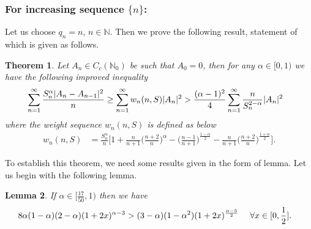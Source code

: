 \documentclass[12pt]{amsart}
\newtheorem{Theorem}{\sc Theorem}[section]
\newtheorem{Lemma}[Theorem]{\sc Lemma}
\theoremstyle{definition}
\theoremstyle{plain}
\theoremstyle{definition}
\numberwithin{equation}{section}
\begin{document}
\subsubsection{For increasing sequence $\{n\}$:}
Let us choose $q_n=n$, $n\in \mathbb{N}$. Then we prove the following result, statement of which is given as follows.
\begin{Theorem}{\label{COP-n}}
Let $A_{n}\in C_{c}(\mathbb{N}_0)$ be such that $A_{0}=0$, then for any $\alpha\in[0,1)$ we have the following improved inequality
\begin{align}{\label{COP-ninq}}
&\displaystyle\sum_{n=1}^{\infty}\frac{S_{n}^{\alpha}|A_n-A_{n-1}|^{2}}{n}\geq\displaystyle\sum_{n=1}^{\infty}w_{n}(n,S)|A_{n}|^{2}>\frac{(\alpha-1)^{2}}{4}
\displaystyle\sum_{n=1}^{\infty}\frac{n}{S_{n}^{2-\alpha}}|A_{n}|^{2}
\end{align}
where the weight sequence $w_{n}(n, S)$ is defined as below
\begin{align*}
w_{n}(n, S)& =\frac{S_{n}^{\alpha}}{n}\Big[1+\frac{n}{n+1}\Big(\frac{n+2}{n}\Big)^{\alpha}-\Big(\frac{n-1}{n+1}\Big)^{\frac{1-\alpha}{2}}-\frac{n}{n+1}
\Big(\frac{n+2}{n}\Big)^{\frac{1+\alpha}{2}}\Big].
\end{align*}
\end{Theorem}
To establish this theorem, we need some results given in the form of lemma. Let us begin with the following lemma.
\begin{Lemma}{\label{17/50}}
If $\alpha\in[\frac{17}{50}, 1)$ then we have
\begin{align}{\label{17/50inq}}
&8\alpha(1-\alpha)(2-\alpha)(1+2x)^{\alpha-3}>(3-\alpha)(1-\alpha^{2})(1+2x)^{\frac{\alpha-5}{2}}~~~~\forall x\in[0,\frac{1}{2}].
\end{align}
\end{Lemma}
\end{document}
